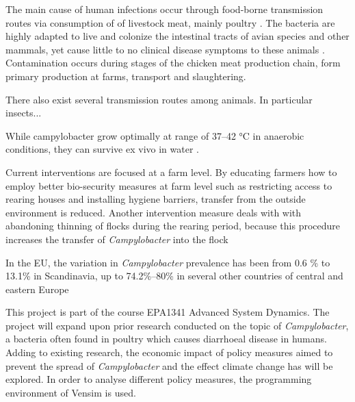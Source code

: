 The main cause of human infections occur through food-borne transmission routes via consumption of of livestock meat, mainly poultry \cite{wilson_tracing_2008}. The bacteria are highly adapted to live and colonize the intestinal tracts of avian species and other mammals, yet cause little to no clinical disease symptoms to these animals \cite{saif_diseases_2008}. Contamination occurs during stages of the chicken meat production chain, form primary production at farms, transport and slaughtering. 

There also exist several transmission routes among animals. In particular insects...

While campylobacter grow optimally at range of 37–42 °C \cite{bronowski_role_2014} in anaerobic conditions, they can survive ex vivo in water \cite{wilson_tracing_2008}. 

Current interventions are focused at a farm level. By educating farmers how to employ better bio-security measures at farm level such as restricting access to rearing houses and installing hygiene barriers, transfer from the outside environment is reduced. Another intervention measure deals with with abandoning thinning of flocks during the rearing period, because this procedure increases the transfer of \textit{Campylobacter} into the flock
    


In the EU, the variation in \textit{Campylobacter} prevalence has been from 0.6 \% to 13.1\% in Scandinavia, up to 74.2\%–80\% in  several  other  countries of central and eastern Europe \cite{skarp_campylobacteriosis_2015} 
















This project is part of the course EPA1341 Advanced System Dynamics. The project will expand upon prior research conducted on the topic of \textit{Campylobacter}, a bacteria often found in poultry which causes diarrhoeal disease in humans. Adding to existing research, the economic impact of policy measures aimed to prevent the spread of  \textit{Campylobacter} and the effect climate change has will be explored. In order to analyse different policy measures, the programming environment of Vensim is used. 

